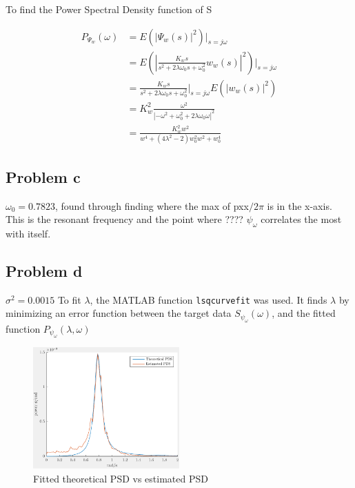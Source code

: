 To find the Power Spectral Density function of S

\begin{align*}
    P_{\Psi_w}(\omega) &= E(\left|\Psi_w(s)\right|^2)|_{s=j\omega} \\
    &= E\left(\left|\frac{K_ws}{s^2 + 2\lambda\omega_0s + \omega^2_0}w_w(s)\right|^2\right)|_{s=j\omega} \\
    &= \frac{K_ws}{s^2 + 2\lambda\omega_0s + \omega^2_0}|_{s=j\omega} E(\left|w_w(s)\right|^2) \\
    &= K_w^2\frac{\omega^2}{\left|-\omega^2+\omega^2_0+2\lambda\omega_0\omega\right|^2} \\
    &= \frac{K_w^2w^2}{w^4+(4\lambda^2-2)w_0^2w^2+w_0^4}
\end{align*}

\subsection{Problem c}

$\omega_0 = 0.7823$, found through finding where the max of pxx$/2\pi$ is in the x-axis. This is the resonant 
frequency and the point where ???? $\psi_\omega$ correlates the most with itself.

\subsection{Problem d}
$\sigma^2 = 0.0015$
To fit $\lambda$, the MATLAB function \texttt{lsqcurvefit} was used. It finds $\lambda$ by minimizing an error
function between the target data $S_{\psi_\omega}(\omega)$, and the fitted function $P_{\psi_\omega}(\lambda, \omega)$

\begin{figure}[ht]
    \centering
    \includegraphics[width=0.5\textwidth]{images/2d-fitted_theoretical_PSD_vs_estimated_PSD}
    \caption{Fitted theoretical PSD vs estimated PSD}
    \label{fig:2d-fitted_theoretical_PSD_vs_estimated_PSD}
\end{figure}
